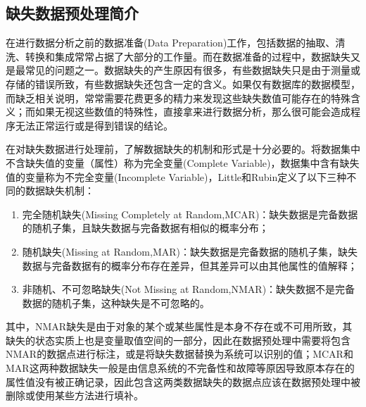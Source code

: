 \documentclass[a4paper]{ctexart}
\begin{document}
\subsection{缺失数据预处理简介}\label{sec:缺失数据预处理简介}
在进行数据分析之前的数据准备(Data Preparation)工作，包括数据的抽取、清洗、转换和集成常常占据了大部分的工作量。而在数据准备的过程中，数据缺失又是最常见的问题之一。数据缺失的产生原因有很多，有些数据缺失只是由于测量或存储的错误所致，有些数据缺失还包含一定的含义\cite{RN163}。如果仅有数据库的数据模型，而缺乏相关说明，常常需要花费更多的精力来发现这些缺失数值可能存在的特殊含义；而如果无视这些数值的特殊性，直接拿来进行数据分析，那么很可能会造成程序无法正常运行或是得到错误的结论。

在对缺失数据进行处理前，了解数据缺失的机制和形式是十分必要的。将数据集中不含缺失值的变量（属性）称为完全变量(Complete Variable)，数据集中含有缺失值的变量称为不完全变量(Incomplete Variable)，Little和Rubin定义了以下三种不同的数据缺失机制\cite{RN163,RN165}：
\begin{enumerate}[label=(\arabic*)]
	\item 完全随机缺失(Missing Completely at Random,MCAR)：缺失数据是完备数据的随机子集，且缺失数据与完备数据有相似的概率分布；
	\item 随机缺失(Missing at Random,MAR)：缺失数据是完备数据的随机子集，缺失数据与完备数据有的概率分布存在差异，但其差异可以由其他属性的值解释；
	\item 非随机、不可忽略缺失(Not Missing at Random,NMAR)：缺失数据不是完备数据的随机子集，这种缺失是不可忽略的。
\end{enumerate}
其中，NMAR缺失是由于对象的某个或某些属性是本身不存在或不可用所致，其缺失的状态实质上也是变量取值空间的一部分，因此在数据预处理中需要将包含NMAR的数据点进行标注，或是将缺失数据替换为系统可以识别的值；MCAR和MAR这两种数据缺失一般是由信息系统的不完备性和故障等原因导致原本存在的属性值没有被正确记录，因此包含这两类数据缺失的数据点应该在数据预处理中被删除或使用某些方法进行填补\cite{RN167}。
\end{document}
